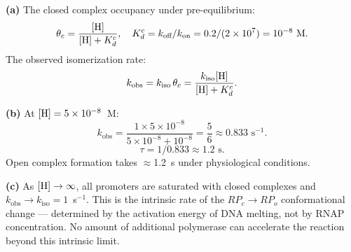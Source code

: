 \documentclass[12pt, a4paper, oneside]{report}
\begin{document}
\begin{solution}
  \textbf{(a)} The closed complex occupancy under pre-equilibrium:
  \[
    \theta_c = \frac{[\mathrm{H}]}{[\mathrm{H}] + K_d^c},
    \quad K_d^c = k_\text{off}/k_\text{on}
               = 0.2/(2\times10^7) = 10^{-8} \text{ M.}
  \]
  The observed isomerization rate:
  \[
    k_\text{obs} = k_\text{iso}\,\theta_c
    = \frac{k_\text{iso}[\mathrm{H}]}{[\mathrm{H}] + K_d^c}.
  \]

  \textbf{(b)} At $[\mathrm{H}] = 5\times10^{-8}$~M:
  \[
    k_\text{obs} = \frac{1 \times 5\times10^{-8}}{5\times10^{-8} + 10^{-8}}
                 = \frac{5}{6} \approx 0.833 \text{ s}^{-1}.
  \]
  \[
    \tau = 1/0.833 \approx 1.2 \text{ s.}
  \]
  Open complex formation takes $\approx$1.2~s under physiological conditions.

  \textbf{(c)} As $[\mathrm{H}] \to \infty$, all promoters are saturated with
  closed complexes and $k_\text{obs} \to k_\text{iso} = 1$~s$^{-1}$.
  This is the intrinsic rate of the $RP_c \to RP_o$ conformational change
  — determined by the activation energy of DNA melting, not by RNAP
  concentration. No amount of additional polymerase can accelerate the
  reaction beyond this intrinsic limit.
\end{solution}
\end{document}
